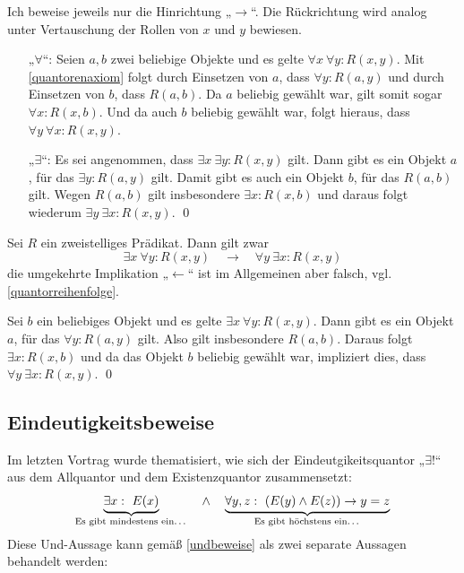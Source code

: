 \begin{bew}
    Ich beweise jeweils nur die Hinrichtung „$\to$“. Die Rückrichtung wird analog unter Vertauschung der Rollen von $x$ und $y$ bewiesen.
    \begin{itemize}
        \item[„$\forall$“:] Seien $a,b$ zwei beliebige Objekte und es gelte $\forall x\ \forall y: R(x,y)$. Mit \cref{quantorenaxiom} folgt durch Einsetzen von $a$, dass $\forall y: R(a,y)$ und durch Einsetzen von $b$, dass $R(a,b)$. Da $a$ beliebig gewählt war, gilt somit sogar $\forall x: R(x,b)$. Und da auch $b$ beliebig gewählt war, folgt hieraus, dass $\forall y\ \forall x: R(x,y)$.
        \item[„$\exists$“:] Es sei angenommen, dass $\exists x\ \exists y: R(x,y)$ gilt. Dann gibt es ein Objekt $a$, für das $\exists y: R(a,y)$ gilt. Damit gibt es auch ein Objekt $b$, für das $R(a,b)$ gilt. Wegen $R(a,b)$ gilt insbesondere $\exists x: R(x,b)$ und daraus folgt wiederum $\exists y\ \exists x: R(x,y)$. \qed
    \end{itemize}
\end{bew}


\begin{satz}
    Sei $R$ ein zweistelliges Prädikat. Dann gilt zwar
        \[ \exists x\ \forall y: R(x,y) \quad\to\quad \forall y\ \exists x: R(x,y) \]  
    die umgekehrte Implikation „$\leftarrow$“ ist im Allgemeinen aber falsch, vgl. \cref{quantorreihenfolge}.
\end{satz}


\begin{bew}
    Sei $b$ ein beliebiges Objekt und es gelte $\exists x\ \forall y: R(x,y)$. Dann gibt es ein Objekt $a$, für das $\forall y: R(a,y)$ gilt. Also gilt insbesondere $R(a,b)$. Daraus folgt $\exists x: R(x,b)$ und da das Objekt $b$ beliebig gewählt war, impliziert dies, dass $\forall y\ \exists x: R(x,y)$. \qed
\end{bew}




\subsection*{Eindeutigkeitsbeweise}


Im letzten Vortrag wurde thematisiert, wie sich der Eindeutgikeitsquantor „$\exists !$“ aus dem Allquantor und dem Existenzquantor zusammensetzt:
    \[ \underbrace{\exists x:\ E(x)}_{\text{Es gibt mindestens ein\dots}}\quad \land\quad \underbrace{\forall y,z:\ (E(y)\land E(z)) \to y=z}_{\text{Es gibt höchstens ein\dots}}\]
Diese Und-Aussage kann gemäß \cref{undbeweise} als zwei separate Aussagen behandelt werden:



